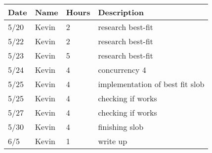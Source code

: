 \begin{tabular}{l l l l}\textbf{Date} & \textbf{Name} & \textbf{Hours} & \textbf{Description}\\\hline

5/20 & Kevin &2 & research best-fit\\\hline
5/22 & Kevin &2 & research best-fit\\\hline
5/23 & Kevin &5 & research best-fit\\\hline
5/24& Kevin &4 & concurrency 4\\\hline
5/25& Kevin &4 & implementation of best fit slob\\\hline
5/25& Kevin &4 & checking if works\\\hline
5/27& Kevin &4 & checking if works\\\hline
5/30& Kevin &4 & finishing slob\\\hline
6/5& Kevin &1 & write up\\\hline
\end{tabular}